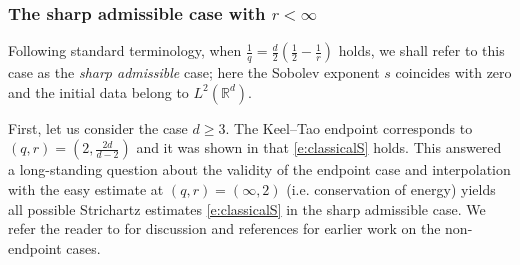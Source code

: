 \documentclass[a4paper]{amsart}
\numberwithin{equation}{section}%
\theoremstyle{plain}%
\theoremstyle{definition}
\theoremstyle{remark}%
\begin{document}
\subsubsection{The sharp admissible case with $r < \infty$} 


Following standard terminology, when $\frac{1}{q} = \frac{d}{2}(\frac{1}{2} - \frac{1}{r})$ holds, we shall refer to this case as the \emph{sharp admissible} case; here the Sobolev exponent $s$ coincides with zero and the initial data belong to $L^2(\mathbb{R}^d)$.

First, let us consider the case $d \geq 3$. The Keel--Tao endpoint corresponds to $(q,r) = (2,\frac{2d}{d-2})$ and it was shown in \cite{KeelTao} that \eqref{e:classicalS} holds. This answered a long-standing question about the validity of the endpoint case and interpolation with the easy estimate at $(q,r) = (\infty,2)$ (i.e. conservation of energy) yields all possible Strichartz estimates \eqref{e:classicalS} in the sharp admissible case. We refer the reader to  \cite{KeelTao} for discussion and references for earlier work on the non-endpoint cases. 
\end{document}
